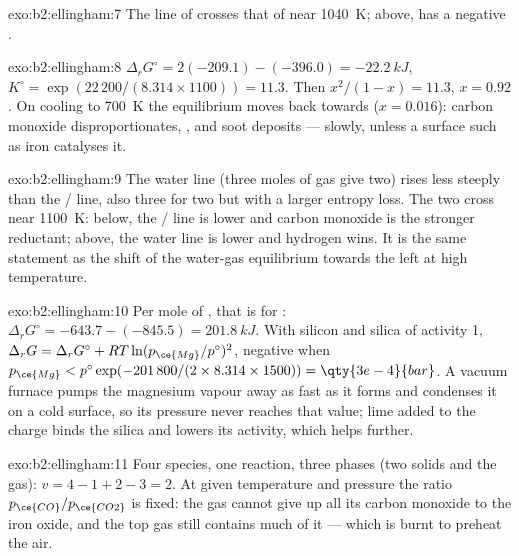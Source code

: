 \begin{solution}{exo:b2:ellingham:7}
The line of  crosses that of  near
\qty{1040}{K}; above,  has a negative .
\end{solution}

\begin{solution}{exo:b2:ellingham:8}
$\Delta_r G^\circ = 2(-209.1) - (-396.0) = \qty{-22.2}{kJ}$, $K^\circ =
\exp(22\,200/(8.314 \times 1100)) = 11.3$. Then $x^2/(1 - x) = 11.3$, $x =
0.92$. On cooling to \qty{700}{K} the equilibrium moves back towards 
($x = 0.016$): carbon monoxide disproportionates, , and
soot deposits --- slowly, unless a surface such as iron catalyses it.
\end{solution}

\begin{solution}{exo:b2:ellingham:9}
The water line (three moles of gas give two) rises less steeply than the
/ line, also three for two but with a larger entropy loss. The
two cross near \qty{1100}{K}: below, the / line is lower and
carbon monoxide is the stronger reductant; above, the water line is lower and
hydrogen wins. It is the same statement as the shift of the water-gas
equilibrium  towards the left at high temperature.
\end{solution}

\begin{solution}{exo:b2:ellingham:10}
Per mole of , that is for : $\Delta_r
G^\circ = -643.7 - (-845.5) = \qty{+201.8}{kJ}$. With silicon and silica of
activity 1, $\Delta_r G = \Delta_r G^\circ + RT\ln(p_{\ce{Mg}}/p^\circ)^2$, negative
when $p_{\ce{Mg}} < p^\circ\exp(-201\,800/(2 \times 8.314 \times 1500)) =
\qty{3e-4}{bar}$. A vacuum furnace pumps the magnesium vapour away as fast
as it forms and condenses it on a cold surface, so its pressure never reaches
that value; lime added to the charge binds the silica and lowers its activity,
which helps further.
\end{solution}

\begin{solution}{exo:b2:ellingham:11}
Four species, one reaction, three phases (two solids and the gas): $v = 4 - 1 +
2 - 3 = 2$. At given temperature and pressure the ratio $p_{\ce{CO}}/p_{\ce{CO2}}$
is fixed: the gas cannot give up all its carbon monoxide to the iron oxide,
and the top gas still contains much of it --- which is burnt to preheat the
air.
\end{solution}

